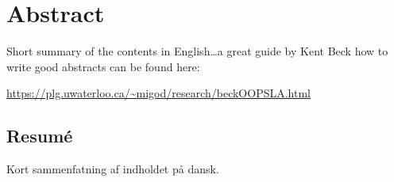 \begingroup
\let\clearpage\relax
\let\cleardoublepage\relax
\let\cleardoublepage\relax

\chapter*{Abstract}
Short summary of the contents in English\dots a great guide by
Kent Beck how to write good abstracts can be found here:
\begin{center}
\url{https://plg.uwaterloo.ca/~migod/research/beckOOPSLA.html}
\end{center}

\vfill

\begin{otherlanguage}{danish}
\chapter*{Resum\'e}
Kort sammenfatning af indholdet på dansk.
\end{otherlanguage}

\endgroup

\vfill

